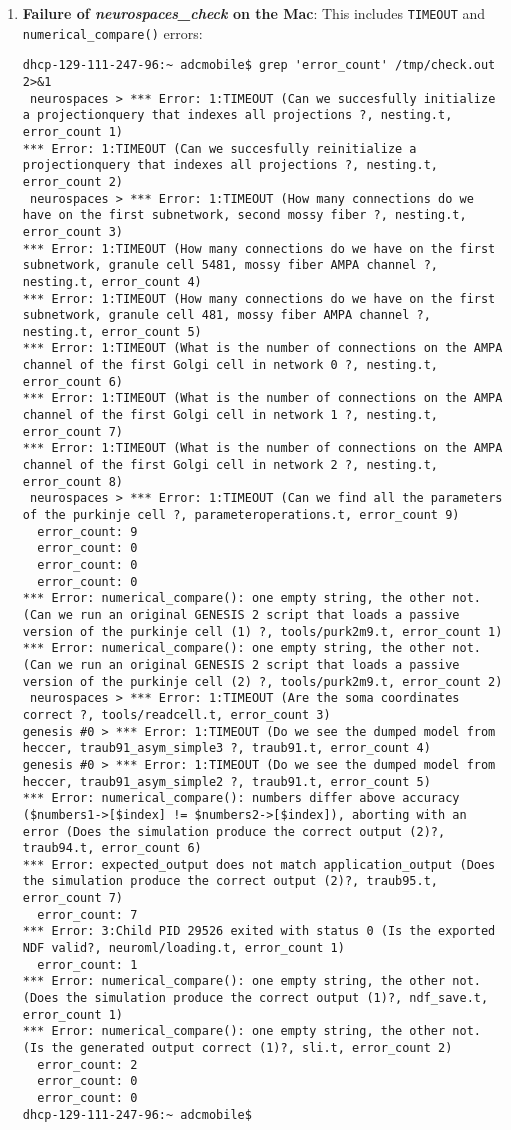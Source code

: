 \documentclass[12pt]{article}
\begin{document}
\begin{enumerate}
\item {\bf Failure of {\it neurospaces\_check} on the Mac}: This includes {\tt TIMEOUT} and {\tt numerical\_compare()} errors:
\begin{verbatim}
dhcp-129-111-247-96:~ adcmobile$ grep 'error_count' /tmp/check.out 2>&1
 neurospaces > *** Error: 1:TIMEOUT (Can we succesfully initialize a projectionquery that indexes all projections ?, nesting.t, error_count 1)
*** Error: 1:TIMEOUT (Can we succesfully reinitialize a projectionquery that indexes all projections ?, nesting.t, error_count 2)
 neurospaces > *** Error: 1:TIMEOUT (How many connections do we have on the first subnetwork, second mossy fiber ?, nesting.t, error_count 3)
*** Error: 1:TIMEOUT (How many connections do we have on the first subnetwork, granule cell 5481, mossy fiber AMPA channel ?, nesting.t, error_count 4)
*** Error: 1:TIMEOUT (How many connections do we have on the first subnetwork, granule cell 481, mossy fiber AMPA channel ?, nesting.t, error_count 5)
*** Error: 1:TIMEOUT (What is the number of connections on the AMPA channel of the first Golgi cell in network 0 ?, nesting.t, error_count 6)
*** Error: 1:TIMEOUT (What is the number of connections on the AMPA channel of the first Golgi cell in network 1 ?, nesting.t, error_count 7)
*** Error: 1:TIMEOUT (What is the number of connections on the AMPA channel of the first Golgi cell in network 2 ?, nesting.t, error_count 8)
 neurospaces > *** Error: 1:TIMEOUT (Can we find all the parameters of the purkinje cell ?, parameteroperations.t, error_count 9)
  error_count: 9
  error_count: 0
  error_count: 0
  error_count: 0
*** Error: numerical_compare(): one empty string, the other not. (Can we run an original GENESIS 2 script that loads a passive version of the purkinje cell (1) ?, tools/purk2m9.t, error_count 1)
*** Error: numerical_compare(): one empty string, the other not. (Can we run an original GENESIS 2 script that loads a passive version of the purkinje cell (2) ?, tools/purk2m9.t, error_count 2)
 neurospaces > *** Error: 1:TIMEOUT (Are the soma coordinates correct ?, tools/readcell.t, error_count 3)
genesis #0 > *** Error: 1:TIMEOUT (Do we see the dumped model from heccer, traub91_asym_simple3 ?, traub91.t, error_count 4)
genesis #0 > *** Error: 1:TIMEOUT (Do we see the dumped model from heccer, traub91_asym_simple2 ?, traub91.t, error_count 5)
*** Error: numerical_compare(): numbers differ above accuracy ($numbers1->[$index] != $numbers2->[$index]), aborting with an error (Does the simulation produce the correct output (2)?, traub94.t, error_count 6)
*** Error: expected_output does not match application_output (Does the simulation produce the correct output (2)?, traub95.t, error_count 7)
  error_count: 7
*** Error: 3:Child PID 29526 exited with status 0 (Is the exported NDF valid?, neuroml/loading.t, error_count 1)
  error_count: 1
*** Error: numerical_compare(): one empty string, the other not. (Does the simulation produce the correct output (1)?, ndf_save.t, error_count 1)
*** Error: numerical_compare(): one empty string, the other not. (Is the generated output correct (1)?, sli.t, error_count 2)
  error_count: 2
  error_count: 0
  error_count: 0
dhcp-129-111-247-96:~ adcmobile$\end{verbatim}

\end{enumerate}
\end{document}
